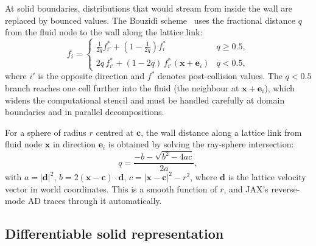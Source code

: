 \documentclass[10pt,twocolumn]{article}
\begin{document}
At solid boundaries, distributions that would stream from inside the
wall are replaced by bounced values. The Bouzidi
scheme~\cite{bouzidi2001} uses the fractional distance $q$ from the
fluid node to the wall along the lattice link:
%
\begin{equation}
f_i = \begin{cases}
\frac{1}{2q} f_{i'}^* + \left(1 - \frac{1}{2q}\right) f_i^*
& q \geq 0.5, \\[6pt]
2q \, f_{i'}^* + (1 - 2q) \, f_{i'}^*(\mathbf{x} + \mathbf{e}_i)
& q < 0.5,
\end{cases}
\label{eq:bouzidi}
\end{equation}
%
where $i'$ is the opposite direction and $f^*$ denotes post-collision
values. The $q < 0.5$ branch reaches one cell further into the fluid
(the neighbour at $\mathbf{x} + \mathbf{e}_i$), which widens the
computational stencil and must be handled carefully at domain boundaries
and in parallel decompositions.

For a sphere of radius $r$ centred at $\mathbf{c}$, the wall distance
along a lattice link from fluid node $\mathbf{x}$ in direction
$\mathbf{e}_i$ is obtained by solving the ray-sphere intersection:
%
\begin{equation}
q = \frac{-b - \sqrt{b^2 - 4ac}}{2a},
\label{eq:ray_sphere}
\end{equation}
%
with $a = |\mathbf{d}|^2$, $b = 2(\mathbf{x} - \mathbf{c}) \cdot
\mathbf{d}$, $c = |\mathbf{x} - \mathbf{c}|^2 - r^2$, where
$\mathbf{d}$ is the lattice velocity vector in world coordinates.
This is a smooth function of $r$, and JAX's reverse-mode AD traces
through it automatically.

\subsection{Differentiable solid representation}
\label{sec:soft_solid}
\end{document}
